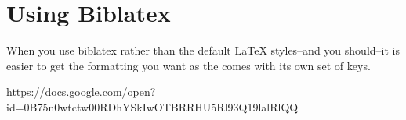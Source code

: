 %
%
%
%
%

\cite[59]{companion}
\cite[see][]{companion}
\cite[see][59--63]{companion}

\section{Using Biblatex}

When you use biblatex rather than the default LaTeX styles--and you should--it is easier to get the formatting you want as the  comes with its own set of keys.


\nocite{*}
\printbibliography[title=REFERENCES]

\printindex

https://docs.google.com/open?id=0B75n0wtctw00RDhYSkIwOTBRRHU5Rl93Q19lalRlQQ
